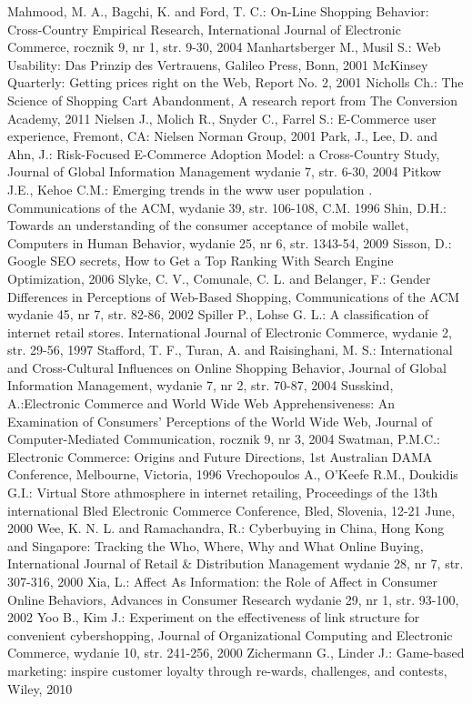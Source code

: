{\begin{thebibliography}{40}
     Mahmood, M. A., Bagchi, K. and Ford, T. C.: On-Line Shopping Behavior: Cross-Country Empirical Research, International Journal of Electronic Commerce, rocznik 9, nr 1, str. 9-30, 2004
     Manhartsberger M., Musil S.: Web Usability: Das Prinzip des Vertrauens, Galileo Press, Bonn, 2001
     McKinsey Quarterly: Getting prices right on the Web, Report No. 2, 2001
     Nicholls Ch.: The Science of Shopping Cart Abandonment, A research report from The Conversion Academy, 2011
     Nielsen J., Molich R., Snyder C., Farrel S.: E-Commerce user experience, Fremont, CA: Nielsen Norman Group, 2001
     Park, J., Lee, D. and Ahn, J.: Risk-Focused E-Commerce Adoption Model: a Cross-Country Study, Journal of Global Information Management wydanie 7, str. 6-30, 2004
     Pitkow J.E., Kehoe C.M.: Emerging trends in the www user population . Communications of the ACM, wydanie 39, str. 106-108, C.M. 1996
     Shin, D.H.: Towards an understanding of the consumer acceptance of mobile wallet,
Computers in Human Behavior, wydanie 25, nr 6, str. 1343-54, 2009
     Sisson, D.: Google SEO secrets, How to Get a Top Ranking With Search Engine Optimization, 2006
     Slyke, C. V., Comunale, C. L. and Belanger, F.: Gender Differences in Perceptions of Web-Based Shopping, Communications of the ACM wydanie 45, nr 7, str. 82-86, 2002
     Spiller P., Lohse G. L.: A classification of internet retail stores. International Journal of Electronic Commerce, wydanie 2, str. 29-56, 1997
     Stafford, T. F., Turan, A. and Raisinghani, M. S.: International and Cross-Cultural Influences on Online Shopping Behavior, Journal of Global Information Management, wydanie 7, nr 2, str. 70-87, 2004
     Susskind, A.:Electronic Commerce and World Wide Web Apprehensiveness: An Examination of Consumers' Perceptions of the World Wide Web, Journal of Computer-Mediated Communication, rocznik 9, nr 3, 2004
     Swatman, P.M.C.: Electronic Commerce: Origins and Future Directions, 1st
Australian DAMA Conference, Melbourne, Victoria, 1996
     Vrechopoulos A., O'Keefe R.M., Doukidis G.I.: Virtual Store athmosphere in internet retailing, Proceedings of the 13th international Bled Electronic Commerce Conference, Bled, Slovenia, 12-21 June, 2000
     Wee, K. N. L. and Ramachandra, R.: Cyberbuying in China, Hong Kong and Singapore: Tracking the Who, Where, Why and What Online Buying, International Journal of Retail \& Distribution Management wydanie 28, nr 7, str. 307-316, 2000
     Xia, L.: Affect As Information: the Role of Affect in Consumer Online Behaviors, Advances in Consumer Research wydanie 29, nr 1, str. 93-100, 2002
     Yoo B., Kim J.: Experiment on the effectiveness of link structure for convenient cybershopping, Journal of Organizational Computing and Electronic Commerce, wydanie 10, str. 241-256, 2000
     Zichermann G., Linder J.: Game-based marketing: inspire customer loyalty through re-wards, challenges, and contests, Wiley, 2010


\end{thebibliography}}
